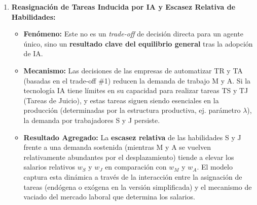 \documentclass{article}
\theoremstyle{remark}
\theoremstyle{definition}
\begin{document}
\begin{enumerate}
\begin{tcolorbox}[title= Solución Punto 1 (Revisado - Versión Preferida)]
\begin{enumerate}
    \item \textbf{Reasignación de Tareas Inducida por IA y Escasez Relativa de Habilidades:}
        \begin{itemize}
            \item \textbf{Fenómeno:} Este no es un \textit{trade-off} de decisión directa para un agente único, sino un \textbf{resultado clave del equilibrio general} tras la adopción de IA.
            \item \textbf{Mecanismo:} Las decisiones de las empresas de automatizar TR y TA (basadas en el trade-off \#1) reducen la demanda de trabajo M y A. Si la tecnología IA tiene límites en su capacidad para realizar tareas TS y TJ (Tareas de Juicio), y estas tareas siguen siendo esenciales en la producción (determinadas por la estructura productiva, ej. parámetro $\lambda$), la demanda por trabajadores S y J persiste.
            \item \textbf{Resultado Agregado:} La \textbf{escasez relativa} de las habilidades S y J frente a una demanda sostenida (mientras M y A se vuelven relativamente abundantes por el desplazamiento) tiende a elevar los salarios relativos $w_S$ y $w_J$ en comparación con $w_M$ y $w_A$. El modelo captura esta dinámica a través de la interacción entre la asignación de tareas (endógena o exógena en la versión simplificada) y el mecanismo de vaciado del mercado laboral que determina los salarios.
        \end{itemize}
        \vspace{0.5em}


\end{enumerate}
\end{tcolorbox}
\end{enumerate}
\end{document}
